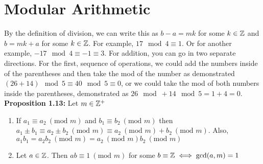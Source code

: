 \section{Modular Arithmetic}


By the definition of division, we can write this as $b - a = mk$ for some $k \in \mathbb{Z}$ and $b = mk + a$ for some $k \in \mathbb{Z}$. For example, $17\mod 4 \equiv 1$. Or for another example, $-17\mod 4 \equiv -1 \equiv 3$. For addition, you can go in two separate directions. For the first, sequence of operations, we could add the numbers inside of the parentheses and then take the mod of the number as demonstrated $(26 + 14)\mod 5 \equiv 40 \mod 5 \equiv 0$, or we could take the mod of both numbers inside the parentheses, demonstrated as $26\mod + 14\mod 5 = 1 + 4 = 0$. \\

\hypertarget{prop 1.13}{\textbf{Proposition 1.13:}} Let $m \in \mathbb{Z}^+$
\begin{enumerate}
    \item If $a_1 \equiv a_2 \ (\text{mod } m)$ and $b_1 \equiv b_2 \ (\text{mod } m)$ then $a_1 \pm b_1 \equiv a_2 \pm b_2 \ (\text{mod } m) \equiv a_2\ (\text{mod } m) + b_2\ (\text{mod } m)$. Also, $a_1b_1 = a_2b_2\ (\text{mod } m)=a_2\ (\text{mod } m) b_2\ (\text{mod } m)$
    \item Let $a \in \mathbb{Z}$. Then $ab \equiv 1\ (\text{mod } m)$ for some $b\equiv \mathbb{Z} \iff \gcd(a,m)=1$
\end{enumerate}


